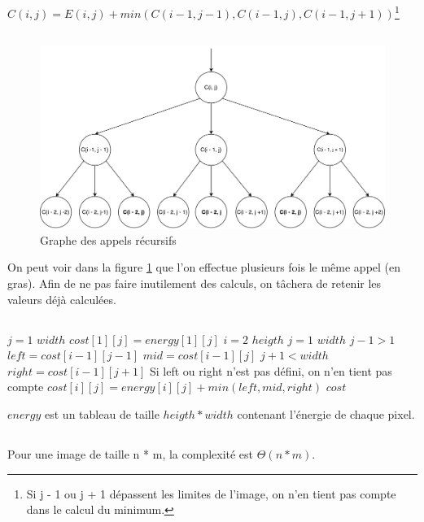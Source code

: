 $C(i, j) = E(i, j) + min(C(i - 1, j -1), C(i - 1, j), C(i - 1, j + 1))$\footnote{Si j - 1 ou j + 1 dépassent les limites de l'image, on n'en tient pas compte dans le calcul du minimum.}
\subsection{} %
\begin{figure}[H]
	\centering
	\includegraphics[width=1\linewidth]{cost.pdf}
	\caption{Graphe des appels récursifs}
	\label{cost}
\end{figure}

On peut voir dans la figure \ref{cost} que l'on effectue plusieurs fois le même appel (en gras). Afin de ne pas faire inutilement des calculs, on tâchera de retenir les valeurs déjà calculées.

\subsection{} %
\begin{codebox}
\li \For $j = 1$ \To $width$
\Do
\li 	$cost[1][j] = energy[1][j]$
\End
\li \For $i = 2$ \To $heigth$
\Do 
\li 	\For $j = 1$ \To $width$
 		\Do
\li 		\If $j - 1> 1$
			\Do 
\li 			$left = cost[i - 1][j - 1]$
\End
\li 		$mid = cost[i - 1][j]$
\li 		\If $j + 1< width$
			\Do 
\li 			$right = cost[i - 1][j + 1]$
\End
\li \Comment Si left ou right n'est pas défini, on n'en tient pas compte
\li 		$cost[i][j] = energy[i][j] + min(left, mid, right)$
	\End
\End
\li \Return $cost$
\end{codebox}
$energy$ est un tableau de taille $heigth * width$ contenant l'énergie de chaque pixel.

\subsection{} %
Pour une image de taille n * m, la complexité est $\Theta(n * m)$.

